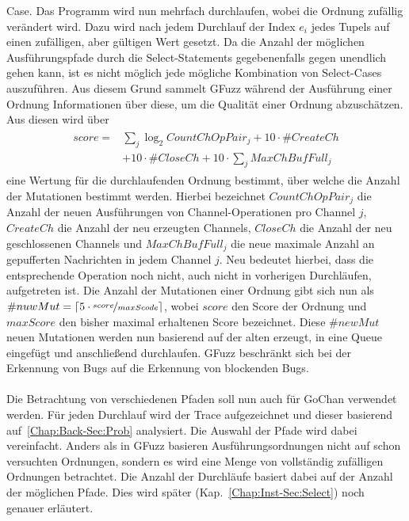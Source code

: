 Case. Das Programm wird nun mehrfach durchlaufen, wobei die Ordnung zufällig 
verändert wird. Dazu wird nach jedem Durchlauf der Index $e_i$ jedes Tupels 
auf einen zufälligen, aber gültigen Wert gesetzt. Da die Anzahl der möglichen 
Ausführungspfade durch die Select-Statements gegebenenfalls gegen unendlich gehen kann,
ist es nicht möglich jede mögliche Kombination von Select-Cases auszuführen.
Aus diesem Grund sammelt GFuzz während der Ausführung einer Ordnung Informationen 
über diese, um die Qualität einer Ordnung abzuschätzen. Aus diesen wird 
über 
\begin{align}
  \begin{split}
    score = &\sum_j \log_2{CountChOpPair_j} + 10 \cdot \# CreateCh \\
            &+ 10 \cdot \#CloseCh + 10 \cdot \sum_j MaxChBufFull_j
  \end{split}
\end{align}
eine Wertung für die durchlaufenden Ordnung bestimmt, über welche die 
Anzahl der Mutationen bestimmt werden. Hierbei bezeichnet $CountChOpPair_j$ 
die Anzahl der neuen Ausführungen von Channel-Operationen pro Channel $j$, $CreateCh$
die Anzahl der neu erzeugten Channels, $CloseCh$ die Anzahl der neu geschlossenen 
Channels und $MaxChBufFull_j$ die neue maximale Anzahl an 
gepufferten Nachrichten in jedem Channel $j$. Neu bedeutet hierbei, dass die
entsprechende Operation noch nicht, auch nicht in vorherigen Durchläufen, 
aufgetreten ist. Die Anzahl der Mutationen 
einer Ordnung gibt sich nun als $\# nuwMut = \lceil 5 \cdot \nicefrac{score}{maxScode} \rceil$, 
wobei $score$ den Score der Ordnung und $maxScore$ den bisher maximal 
erhaltenen Score bezeichnet. Diese $\# newMut$ neuen Mutationen werden nun 
basierend auf der alten erzeugt, in eine Queue eingefügt und anschließend 
durchlaufen. GFuzz beschränkt sich bei der Erkennung von Bugs auf die Erkennung
von blockenden Bugs.\\\\
Die Betrachtung von verschiedenen Pfaden soll nun auch für GoChan 
 verwendet werden. Für jeden Durchlauf wird 
der Trace aufgezeichnet und dieser basierend 
auf~\ref{Chap:Back-Sec:Prob}
analysiert. Die Auswahl der Pfade wird dabei vereinfacht. Anders als 
in GFuzz basieren Ausführungsordnungen nicht auf schon versuchten Ordnungen, 
sondern es wird eine Menge von vollständig zufälligen Ordnungen betrachtet. 
Die Anzahl der Durchläufe basiert dabei auf der Anzahl der möglichen Pfade.
Dies wird später (Kap.~\ref{Chap:Inst-Sec:Select}) noch genauer erläutert. 

